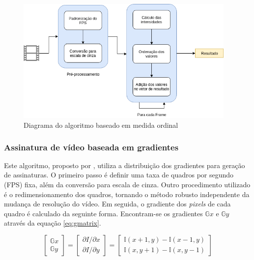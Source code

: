  \begin{figure}[h]
      \centering
      \includegraphics[width=0.96\textwidth]{dados/figuras/MedidaOrdinal.png}
      \caption{Diagrama do algoritmo baseado em medida ordinal}
       	\label{fig:dia_ordinal}
    \end{figure}  

%
%


\subsubsection{Assinatura de vídeo baseada em gradientes}
\label{sec:gradientes}

	Este algoritmo, proposto por \citeauthor{lee2008robust}, utiliza a distribuição dos gradientes para geração de assinaturas. O primeiro passo é definir uma taxa de quadros por segundo (FPS) fixa, além da conversão para escala de cinza. Outro procedimento utilizado é o redimensionamento dos quadros, tornando o  método robusto independente da mudança de resolução do vídeo. Em seguida, o gradiente dos \textit{pixels} de cada quadro é calculado da seguinte forma. Encontram-se os gradientes $\mathbb{G}x$ e $\mathbb{G}y$ através da equação \ref{eq:gmatrix}.

\begin{equation}
  \label{eq:gmatrix}
  \begin{bmatrix}
    \mathbb{G}x
    \\ 
    \mathbb{G}y
  \end{bmatrix}= 
  \begin{bmatrix}
    \partial I/\partial x
    \\ 
    \partial I/\partial y
  \end{bmatrix}=
  \begin{bmatrix}
    \mathbb{I}(x+1, y) - \mathbb{I}(x-1,y)
    \\ 
    \mathbb{I}(x, y+1) - \mathbb{I}(x,y-1)
  \end{bmatrix}
\end{equation}
    

